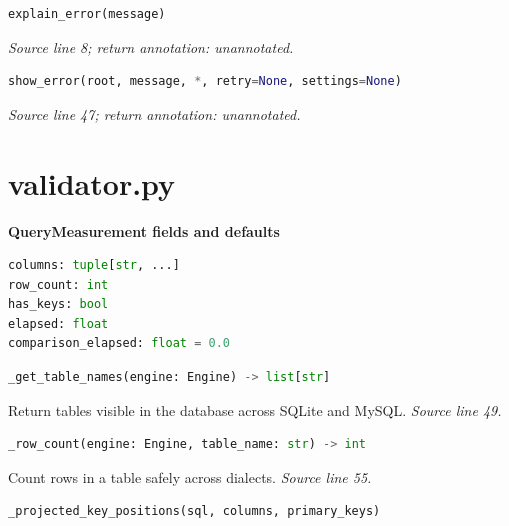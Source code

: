 


\begin{lstlisting}[language=Python]
explain_error(message)
\end{lstlisting}


{\small \textit{Source line 8; return annotation: unannotated.}}



\begin{lstlisting}[language=Python]
show_error(root, message, *, retry=None, settings=None)
\end{lstlisting}


{\small \textit{Source line 47; return annotation: unannotated.}}

\section{validator.py}


\textbf{QueryMeasurement fields and defaults}


\begin{lstlisting}[language=Python]
columns: tuple[str, ...]
row_count: int
has_keys: bool
elapsed: float
comparison_elapsed: float = 0.0
\end{lstlisting}




\begin{lstlisting}[language=Python]
_get_table_names(engine: Engine) -> list[str]
\end{lstlisting}


{\small Return tables visible in the database across SQLite and MySQL. \textit{Source line 49.}}



\begin{lstlisting}[language=Python]
_row_count(engine: Engine, table_name: str) -> int
\end{lstlisting}


{\small Count rows in a table safely across dialects. \textit{Source line 55.}}



\begin{lstlisting}[language=Python]
_projected_key_positions(sql, columns, primary_keys)
\end{lstlisting}


